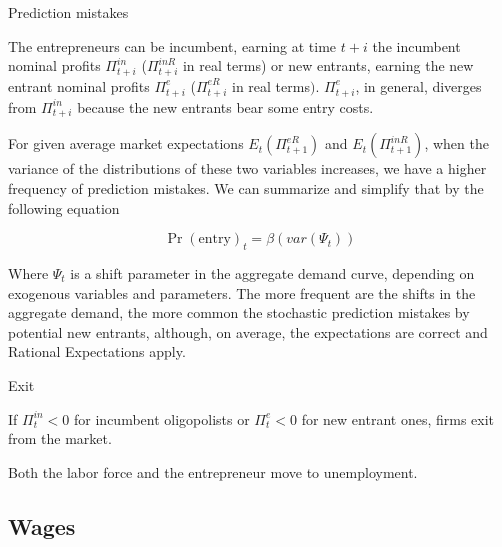 \documentclass[9pt]{beamer}
\begin{document}
\begin{frame}{Prediction mistakes}

\small
The entrepreneurs can be incumbent, earning at time $t+i$ the incumbent
nominal profits $\Pi _{t+i}^{in}$ ($\Pi _{t+i}^{inR}$ in real terms) or new
entrants, earning the new entrant nominal profits $\Pi _{t+i}^{e}$ ($\Pi
_{t+i}^{eR}$ in real terms$).$ $\Pi _{t+i}^{e}$, in general, diverges from $%
\Pi _{t+i}^{in}$ because the new entrants bear some entry costs.

\bigskip
\normalsize
For given average market expectations $E_{t}(\Pi _{t+1}^{eR})$ and $%
E_{t}(\Pi _{t+1}^{inR})$, when the variance of the distributions of these
two variables increases, we have a higher frequency of prediction mistakes.
We can summarize and simplify that by the following equation

\begin{equation}
\Pr (\text{entry})_{t}=\beta (var(\Psi _{t}))
\end{equation}

\bigskip
\small
Where $\Psi _{t}$ is a shift parameter in the aggregate demand curve, depending on exogenous variables and parameters. The more frequent are the shifts in the aggregate demand, the more common the stochastic prediction mistakes by potential new entrants, although, on average, the expectations are correct and Rational Expectations apply. 


\end{frame}

\begin{frame}{Exit}

If $\Pi _t^{in} < 0$ for incumbent oligopolists or $\Pi_t^{e} < 0 $ for new entrant ones, firms exit from the market.

\bigskip

Both the labor force and the entrepreneur move to unemployment.

\end{frame}

\subsection{Wages}
\end{document}
